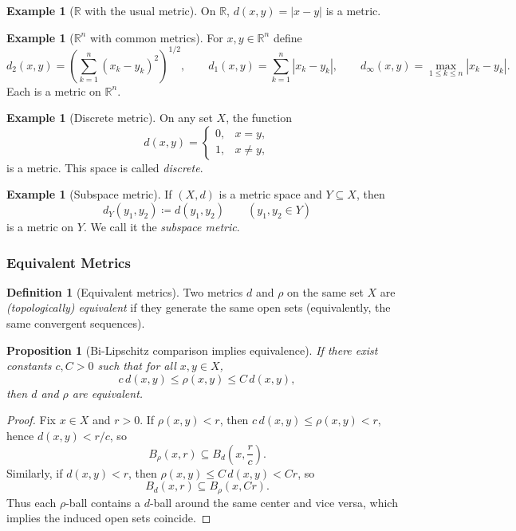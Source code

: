 \documentclass[12pt]{article}
\numberwithin{equation}{section}
\def\abs#1{|#1|}
\newcommand{\RR}{\mathbb{R}}
\DeclarePairedDelimiter{\abs}{\lvert}{\rvert}
\newcommand{\casesm}[1]{\begin{cases}#1\end{cases}}
\theoremstyle{plain}
\newtheorem{proposition}[theorem]{Proposition}
\theoremstyle{definition}
\newtheorem{definition}[theorem]{Definition}
\newtheorem{example}[theorem]{Example}
\theoremstyle{remark}
\begin{document}
\begin{example}[$\RR$ with the usual metric]\label{ms:ex:R}
On $\RR$, $d(x,y)=\abs{x-y}$ is a metric.
\end{example}

\begin{example}[$\RR^n$ with common metrics]\label{ms:ex:Rn-metrics}
For $x,y\in\RR^n$ define
\[
d_2(x,y)=\left(\sum_{k=1}^n (x_k-y_k)^2\right)^{1/2},\qquad
d_1(x,y)=\sum_{k=1}^n \abs{x_k-y_k},\qquad
d_\infty(x,y)=\max_{1\le k\le n}\abs{x_k-y_k}.
\]
Each is a metric on $\RR^n$.
\end{example}

\begin{example}[Discrete metric]\label{ms:ex:discrete}
On any set $X$, the function
\[
d(x,y)=
\casesm{
0, & x=y,\\
1, & x\neq y,
}
\]
is a metric. This space is called \emph{discrete}.
\end{example}

\begin{example}[Subspace metric]\label{ms:ex:subspace}
If $(X,d)$ is a metric space and $Y\subseteq X$, then
\[
d_Y(y_1,y_2)\coloneqq d(y_1,y_2)\qquad (y_1,y_2\in Y)
\]
is a metric on $Y$. We call it the \emph{subspace metric}.
\end{example}

\subsubsection{Equivalent Metrics}

\begin{definition}[Equivalent metrics]\label{ms:def:equiv-metric}
Two metrics $d$ and $\rho$ on the same set $X$ are \emph{(topologically) equivalent} if they generate the same open sets
(equivalently, the same convergent sequences).
\end{definition}

\begin{proposition}[Bi-Lipschitz comparison implies equivalence]\label{ms:prop:bilip-equivalence}
If there exist constants $c,C>0$ such that for all $x,y\in X$,
\[
c\,d(x,y)\le \rho(x,y)\le C\,d(x,y),
\]
then $d$ and $\rho$ are equivalent.
\end{proposition}

\begin{proof}
Fix $x\in X$ and $r>0$.
If $\rho(x,y)<r$, then $c\,d(x,y)\le \rho(x,y)<r$, hence $d(x,y)<r/c$, so
\[
B_\rho(x,r)\subseteq B_d\!\left(x,\frac{r}{c}\right).
\]
Similarly, if $d(x,y)<r$, then $\rho(x,y)\le C\,d(x,y)<Cr$, so
\[
B_d(x,r)\subseteq B_\rho(x,Cr).
\]
Thus each $\rho$-ball contains a $d$-ball around the same center and vice versa, which implies the induced open sets coincide.
\end{proof}
\end{document}
